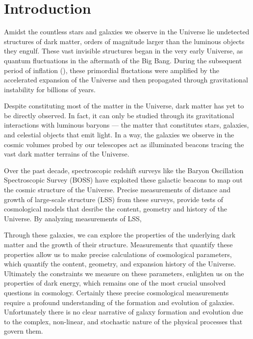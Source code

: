 \chapter*{Introduction}
Amidst the countless stars and galaxies we observe in the Universe lie 
undetected structures of dark matter, orders of magnitude larger than 
the luminous objects they engulf. These vast invisible structures began 
in the very early Universe, as quantum fluctuations in the aftermath of 
the Big Bang. 
During the subsequent period of inflation (), these primordial fluctations 
were amplified by the accelerated expansion of the Universe and then 
propagated through gravitational instability for billions of years. 

Despite constituting most of the matter in the Universe, dark matter 
has yet to be directly observed. In fact, it can only be studied through 
its gravitational interactions with luminous baryons — the matter that 
constitutes stars, galaxies, and celestial objects that emit light. 
In a way, the galaxies we observe in the cosmic volumes probed by our 
telescopes act as illuminated beacons tracing the vast dark matter 
terrains of the Universe.

Over the past decade, spectroscopic redshift surveys like the 
Baryon Oscillation Spectroscopic Survey (BOSS) have 
exploited these galactic beacons to map out the cosmic structure
of the Universe. Precise measurements of distance and growth 
of large-scale structure (LSS) from these surveys, provide tests 
of cosmological models that desribe the content, geometry and history 
of the Universe. By analyzing measurements of LSS,  


Through these galaxies, we can explore the properties of the underlying dark matter
and the growth of their structure. Measurements that quantify these properties allow us to make
precise calculations of cosmological parameters, which quantify the content, geometry, and
expansion history of the Universe. Ultimately the constraints we measure on these parameters,
enlighten us on the properties of dark energy, which remains one of the most crucial unsolved
questions in cosmology. Certainly these precise cosmological measurements require a profound
understanding of the formation and evolution of galaxies. Unfortunately there is no clear
narrative of galaxy formation and evolution due to the complex, non-linear, and stochastic nature
of the physical processes that govern them.

